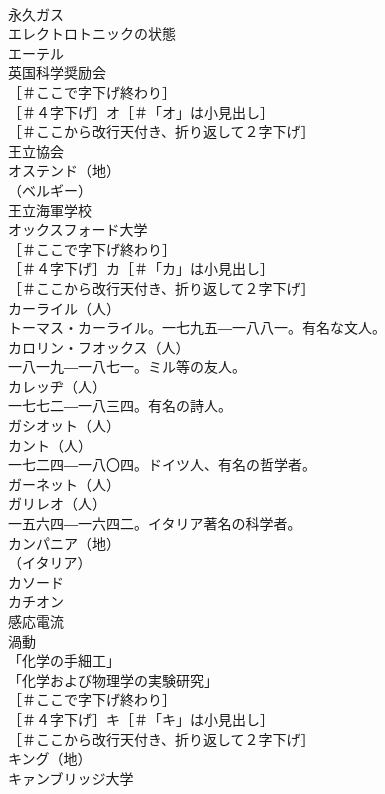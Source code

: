 \documentclass[8pt]{extreport}
\begin{document}
\begin{CJK}{UTF8}{min}
\\	永久ガス 
\\	エレクトロトニックの状態 
\\	エーテル 
\\	英国科学奨励会 
\\	［＃ここで字下げ終わり］
\\	［＃４字下げ］オ［＃「オ」は小見出し］
\\	［＃ここから改行天付き、折り返して２字下げ］
\\	王立協会 
\\	オステンド（地）
\\	（ベルギー）
\\	王立海軍学校 
\\	オックスフォード大学 
\\	［＃ここで字下げ終わり］
\\	［＃４字下げ］カ［＃「カ」は小見出し］
\\	［＃ここから改行天付き、折り返して２字下げ］
\\	カーライル（人）
\\	トーマス・カーライル。一七九五―一八八一。有名な文人。
\\	カロリン・フオックス（人）
\\	一八一九―一八七一。ミル等の友人。
\\	カレッヂ（人）
\\	一七七二―一八三四。有名の詩人。
\\	ガシオット（人）
\\	カント（人）
\\	一七二四―一八〇四。ドイツ人、有名の哲学者。
\\	ガーネット（人）
\\	ガリレオ（人）
\\	一五六四―一六四二。イタリア著名の科学者。
\\	カンパニア（地）
\\	（イタリア）
\\	カソード 
\\	カチオン 
\\	感応電流 
\\	渦動 
\\	「化学の手細工」
\\	「化学および物理学の実験研究」 
\\	［＃ここで字下げ終わり］
\\	［＃４字下げ］キ［＃「キ」は小見出し］
\\	［＃ここから改行天付き、折り返して２字下げ］
\\	キング（地）
\\	キァンブリッジ大学 

\end{CJK}
\end{document}
